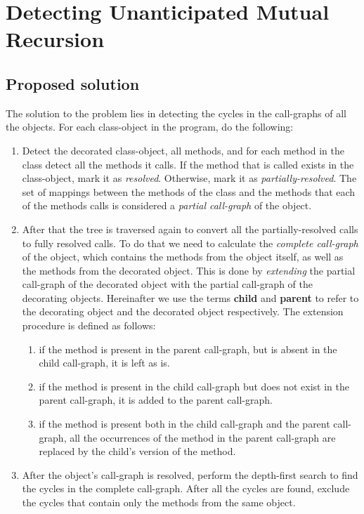\section{Detecting Unanticipated Mutual Recursion}
\label{impl:mutualrec}

\subsection{Proposed solution}
\label{impl:mutualrec_algo}
The solution to the problem lies in detecting the cycles in the call-graphs of all the objects. For each class-object in the program, do the following:
\begin{enumerate}
    \item Detect the decorated class-object, all methods, and for each method in the class detect all the methods it calls. If the method that is called exists in the class-object, mark it as \textit{resolved}. Otherwise, mark it as \textit{partially-resolved}. The set of mappings between the methods of the class and the methods that each of the methods calls is considered a \textit{partial call-graph} of the object.
    \item After that the tree is traversed again to convert all the partially-resolved calls to fully resolved calls. To do that we need to calculate the \textit{complete call-graph} of the object, which contains the methods from the object itself, as well as the methods from the decorated object. This is done by \textit{extending} the partial call-graph of the decorated object with the partial call-graph of the decorating objects. Hereinafter we use the terms \textbf{child} and \textbf{parent} to refer to the decorating object and the decorated object respectively. The extension procedure is defined as follows:
          \begin{enumerate}
              \item if the method is present in the parent call-graph, but is absent in the child call-graph, it is left as is.
              \item if the method is present in the child call-graph but does not exist in the parent call-graph, it is added to the parent call-graph.
              \item if the method is present both in the child call-graph and the parent call-graph, all the occurrences of the method in the parent call-graph are replaced by the child's version of the method.
          \end{enumerate}
    \item After the object's call-graph is resolved, perform the depth-first search \cite{dfs} to find the cycles in the complete call-graph. After all the cycles are found, exclude the cycles that contain only the methods from the same object.
\end{enumerate}

